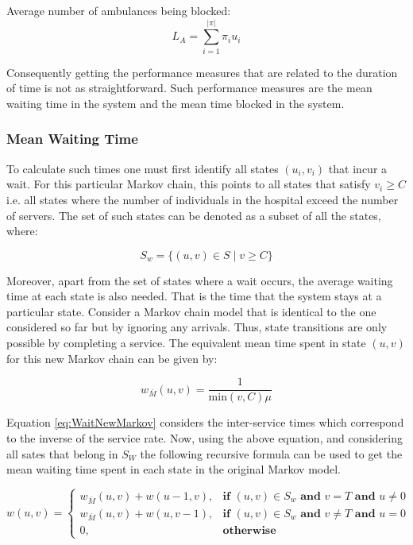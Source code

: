 Average number of ambulances being blocked:
\begin{equation}
    L_A = \sum_{i=1}^{|\pi|} \pi_i u_i
\end{equation}

Consequently getting the performance measures that are related to the duration of time is not as straightforward. Such performance measures are the mean waiting time in the system and the mean time blocked in the system. 

\subsubsection{Mean Waiting Time}
To calculate such times one must first identify all states \((u_i, v_i)\) that incur a wait. For this particular Markov chain, this points to all states that satisfy \( v_i \geq C \) i.e. all states where the number of individuals in the hospital exceed the number of servers. The set of such states can be denoted as a subset of all the states, where:

\[
S_w = \{(u, v) \in S \; | \; v \geq C \}    
\]

Moreover, apart from the set of states where a wait occurs, the average waiting time at each state is also needed. That is the time that the system stays at a particular state. Consider a Markov chain model that is identical to the one considered so far but by ignoring any arrivals. Thus, state transitions are only possible by completing a service. The equivalent mean time spent in state \((u,v)\) for this new Markov chain can be given by:

\begin{equation} \label{eq:WaitNewMarkov}
    w_{\bar{M}}(u,v) = \frac{1}{\text{min}(v, C) \mu}    
\end{equation}

Equation \ref{eq:WaitNewMarkov} considers the inter-service times which correspond to the inverse of the service rate. Now, using the above equation, and considering all sates that belong in \(S_W\) the following recursive formula can be used to get the mean waiting time spent in each state in the original Markov model.

\begin{equation}
    w(u,v) = 
    \begin{cases}
        w_{\bar{M}}(u,v) + w(u-1,v),  & \textbf{if } (u,v) \in S_w \textbf{ and } v = T \textbf{ and } u \neq 0\\
        w_{\bar{M}}(u,v) + w(u,v-1), & \textbf{if } (u,v) \in S_w \textbf{ and } v \neq T \textbf{ and } u = 0\\
        0, & \textbf{otherwise}
    \end{cases}
\end{equation}

















